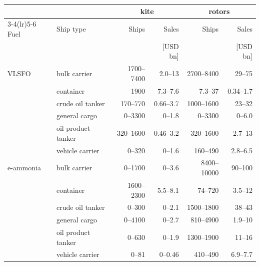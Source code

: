 \begin{tabular}{@{}llrrrr@{}}
\toprule
 & & \multicolumn{2}{c}{kite} & \multicolumn{2}{c}{rotors} \\
\cmidrule(lr){3-4}\cmidrule(lr){5-6}
Fuel & Ship type & Ships & Sales & Ships & Sales \\
 &  &  & [USD bn] &  & [USD bn] \\
\midrule
VLSFO & bulk carrier & \num{1700}--\num{7400} & \num{2.0}--\num{13} & \num{2700}--\num{8400} & \num{29}--\num{75} \\
 & container & \num{1900} & \num{7.3}--\num{7.6} & \num{7.3}--\num{37} & \num{0.34}--\num{1.7} \\
 & crude oil tanker & \num{170}--\num{770} & \num{0.66}--\num{3.7} & \num{1000}--\num{1600} & \num{23}--\num{32} \\
 & general cargo & 0--\num{3300} & 0--\num{1.8} & 0--\num{3300} & 0--\num{6.0} \\
 & oil product tanker & \num{320}--\num{1600} & \num{0.46}--\num{3.2} & \num{320}--\num{1600} & \num{2.7}--\num{13} \\
 & vehicle carrier & 0--\num{320} & 0--\num{1.6} & \num{160}--\num{490} & \num{2.8}--\num{6.5} \\
\midrule
e-ammonia & bulk carrier & 0--\num{1700} & 0--\num{3.6} & \num{8400}--\num{10000} & \num{90}--\num{100} \\
 & container & \num{1600}--\num{2300} & \num{5.5}--\num{8.1} & \num{74}--\num{720} & \num{3.5}--\num{12} \\
 & crude oil tanker & 0--\num{300} & 0--\num{2.1} & \num{1500}--\num{1800} & \num{38}--\num{43} \\
 & general cargo & 0--\num{4100} & 0--\num{2.7} & \num{810}--\num{4900} & \num{1.9}--\num{10} \\
 & oil product tanker & 0--\num{630} & 0--\num{1.9} & \num{1300}--\num{1900} & \num{11}--\num{16} \\
 & vehicle carrier & 0--\num{81} & 0--\num{0.46} & \num{410}--\num{490} & \num{6.9}--\num{7.7} \\
\bottomrule
\end{tabular}
